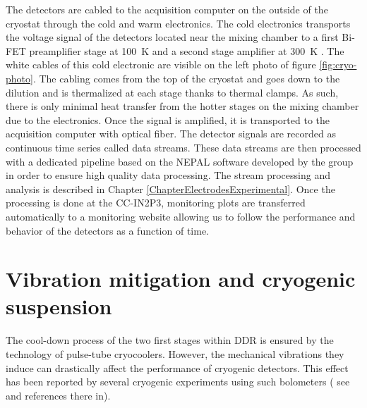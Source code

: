 The detectors are cabled to the acquisition computer on the outside of the cryostat through the cold and warm electronics. The cold electronics transports the voltage signal of the detectors located near the mixing chamber to a first Bi-FET preamplifier stage at \SI{100}{\kelvin} and a second stage amplifier at \SI{300}{\kelvin} \cite{Armengaud:2017rzu}.
The white cables of this cold electronic are visible on the left photo of figure \ref{fig:cryo-photo}. The cabling comes from the top of the cryostat and goes down to the dilution and is thermalized at each stage thanks to thermal clamps. As such, there is only minimal heat transfer from the hotter stages  on the mixing chamber due to the electronics.
Once the signal is amplified, it is transported to the acquisition computer with optical fiber. The detector signals are recorded as continuous time series called data streams. These data streams are then processed with a dedicated pipeline based on the NEPAL software developed by the group in order to ensure high quality data processing. The stream processing and analysis is described in Chapter \ref{ChapterElectrodesExperimental}. Once the processing is done at the CC-IN2P3, monitoring plots are transferred automatically to a monitoring website allowing us to follow the performance and behavior of the detectors as a function of time.



\section{Vibration mitigation and cryogenic suspension}
\label{sec:suspended-tower}

The cool-down process of the two first stages within DDR is ensured by the technology of pulse-tube cryocoolers. However, the mechanical vibrations they induce can drastically affect the performance of cryogenic detectors. This effect has been reported by several cryogenic experiments using such bolometers ( see \cite{Maisonobe:2018tbq} and references there in).

